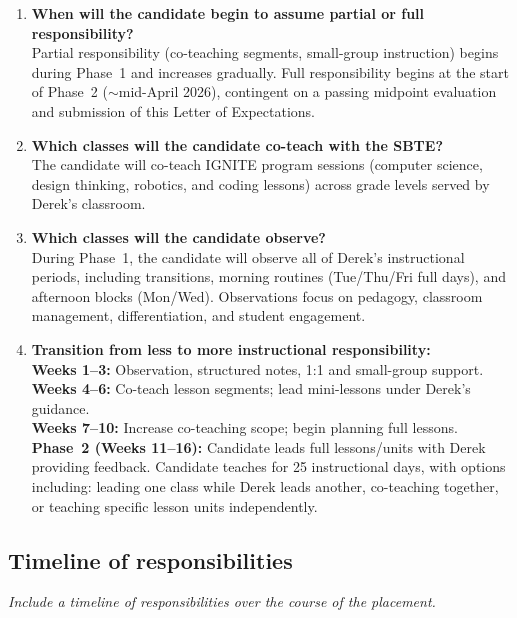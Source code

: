 \documentclass[10pt]{article}
\begin{document}
\begin{enumerate}[leftmargin=*,itemsep=0.25em]
  \item \textbf{When will the candidate begin to assume partial or full responsibility?}\\
        Partial responsibility (co-teaching segments, small-group instruction) begins during Phase~1 and increases gradually. Full responsibility begins at the start of Phase~2 ($\sim$mid-April 2026), contingent on a passing midpoint evaluation and submission of this Letter of Expectations.
  \item \textbf{Which classes will the candidate co-teach with the SBTE?}\\
        The candidate will co-teach IGNITE program sessions (computer science, design thinking, robotics, and coding lessons) across grade levels served by Derek's classroom.
  \item \textbf{Which classes will the candidate observe?}\\
        During Phase~1, the candidate will observe all of Derek's instructional periods, including transitions, morning routines (Tue/Thu/Fri full days), and afternoon blocks (Mon/Wed). Observations focus on pedagogy, classroom management, differentiation, and student engagement.
  \item \textbf{Transition from less to more instructional responsibility:}\\
        \textbf{Weeks 1--3:} Observation, structured notes, 1:1 and small-group support.\\
        \textbf{Weeks 4--6:} Co-teach lesson segments; lead mini-lessons under Derek's guidance.\\
        \textbf{Weeks 7--10:} Increase co-teaching scope; begin planning full lessons.\\
        \textbf{Phase~2 (Weeks 11--16):} Candidate leads full lessons/units with Derek providing feedback. Candidate teaches for 25 instructional days, with options including: leading one class while Derek leads another, co-teaching together, or teaching specific lesson units independently.
\end{enumerate}

\subsection{Timeline of responsibilities}
\textit{Include a timeline of responsibilities over the course of the placement.}
\end{document}
